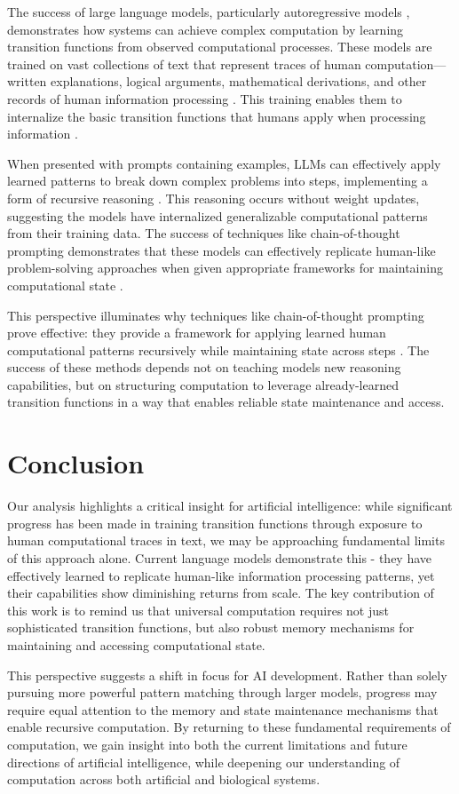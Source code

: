 \documentclass[12pt]{article}
\begin{document}
The success of large language models, particularly autoregressive models \cite{schuurmans2024autoregressive}, demonstrates how systems can achieve complex computation by learning transition functions from observed computational processes. These models are trained on vast collections of text that represent traces of human computation---written explanations, logical arguments, mathematical derivations, and other records of human information processing \cite{brown2020language}. This training enables them to internalize the basic transition functions that humans apply when processing information \cite{wei2022chain}.

When presented with prompts containing examples, LLMs can effectively apply learned patterns to break down complex problems into steps, implementing a form of recursive reasoning \cite{wei2022chain}. This reasoning occurs without weight updates, suggesting the models have internalized generalizable computational patterns from their training data. The success of techniques like chain-of-thought prompting demonstrates that these models can effectively replicate human-like problem-solving approaches when given appropriate frameworks for maintaining computational state \cite{wei2022emergent}.

This perspective illuminates why techniques like chain-of-thought prompting prove effective: they provide a framework for applying learned human computational patterns recursively while maintaining state across steps \cite{wei2022chain}. The success of these methods depends not on teaching models new reasoning capabilities, but on structuring computation to leverage already-learned transition functions in a way that enables reliable state maintenance and access.

\section{Conclusion}

Our analysis highlights a critical insight for artificial intelligence: while significant progress has been made in training transition functions through exposure to human computational traces in text, we may be approaching fundamental limits of this approach alone. Current language models demonstrate this - they have effectively learned to replicate human-like information processing patterns, yet their capabilities show diminishing returns from scale. The key contribution of this work is to remind us that universal computation requires not just sophisticated transition functions, but also robust memory mechanisms for maintaining and accessing computational state.

This perspective suggests a shift in focus for AI development. Rather than solely pursuing more powerful pattern matching through larger models, progress may require equal attention to the memory and state maintenance mechanisms that enable recursive computation. By returning to these fundamental requirements of computation, we gain insight into both the current limitations and future directions of artificial intelligence, while deepening our understanding of computation across both artificial and biological systems.

\begingroup
\footnotesize


\endgroup
\end{document}
